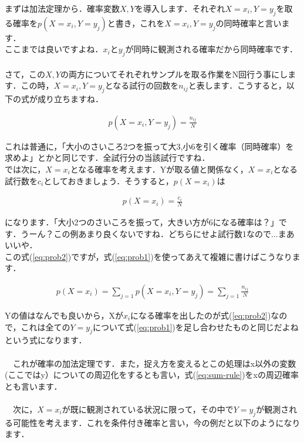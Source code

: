 \documentclass[11pt,a4paper]{ujreport} 	%
\begin{document}
まずは加法定理から．確率変数$X,Y$を導入します．それぞれ$X=x_i, Y=y_j$を取る確率を$p(X=x_i, Y=y_j)$と書き，これを$X=x_i, Y=y_j$の同時確率と言います．\\

ここまでは良いですよね．$x_iとy_j$が同時に観測される確率だから同時確率です．\\
\\

さて，この$X, Y$の両方についてそれぞれサンプルを取る作業をN回行う事にします．この時，$X=x_i, Y=y_j$となる試行の回数を$n_{ij}$と表します．こうすると，以下の式が成り立ちますね．

\begin{align}
\label{eq:prob1}
p(X=x_i, Y=y_j) = \frac{n_{ij}}{N}
\end{align}

これは普通に，「大小のさいころ2つを振って大3,小6を引く確率（同時確率）を求めよ」とかと同じです．全試行分の当該試行ですね．
\\

では次に，$X=x_i$となる確率を考えます．Yが取る値と関係なく，$X=x_i$となる試行数を$c_i$としておきましょう．そうすると，$p(X=x_i)$は

\begin{align}
\label{eq:prob2}
p(X=x_i) = \frac{c_i}{N}
\end{align}

になります．「大小2つのさいころを振って，大きい方が6になる確率は？」です．うーん？この例あまり良くないですね．どちらにせよ試行数1なので...まあいいや．\\

この式(\ref{eq:prob2})ですが，式(\ref{eq:prob1})を使ってあえて複雑に書けばこうなります．

\begin{align}
\label{eq:sum-rule}
p(X=x_i) = \sum_{j=1} p(X=x_i, Y=y_j) = \sum_{j=1} \frac{n_{ij}}{N}
\end{align}

Yの値はなんでも良いから，Xが$x_i$になる確率を出したのが式(\ref{eq:prob2})なので，これは全ての$Y=y_j$について式(\ref{eq:prob1})を足し合わせたものと同じだよねという式になります．\\
\\
　これが確率の加法定理です．また，捉え方を変えるとこの処理はx以外の変数(ここではy）についての周辺化をするとも言い，式(\ref{eq:sum-rule})をxの周辺確率とも言います．\\
\\
　次に，$X=x_i$が既に観測されている状況に限って，その中で$Y=y_j$が観測される可能性を考えます．これを条件付き確率と言い，今の例だと以下のようになります．
\end{document}
